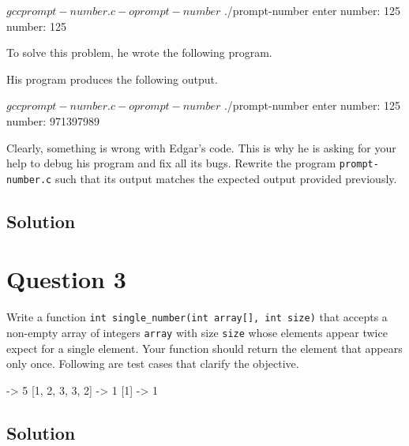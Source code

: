 \documentclass[12pt,letterpaper,twoside]{article}
\begin{document}
\begin{terminal}
$ gcc prompt-number.c -o prompt-number
$ ./prompt-number
enter number: 125
number: 125
\end{terminal}

To solve this problem, he wrote the following program.

\lstset{language=c,tabsize=4}


His program produces the following output.

\begin{terminal}
$ gcc prompt-number.c -o prompt-number
$ ./prompt-number
enter number: 125
number: 971397989
\end{terminal}

\newpage

Clearly, something is wrong with Edgar's code.
This is why he is asking for your help to debug his program and fix all its bugs.
Rewrite the program \texttt{prompt-number.c} such that its output matches the expected output provided previously.

\subsection*{Solution}

\lstset{language=c,tabsize=4}


\newpage

\section*{Question 3}

Write a function \texttt{int single\_number(int array[], int size)} that accepts a non-empty array of integers \texttt{array} with size \texttt{size} whose elements appear twice expect for a single element.
Your function should return the element that appears only once.
Following are test cases that clarify the objective.

\begin{terminal}
[1, -1, 4, 5, 4, 1, -1] -> 5
[1, 2, 3, 3, 2] -> 1
[1] -> 1
\end{terminal}

\subsection*{Solution}

\lstset{language=c,tabsize=4}

\end{document}
